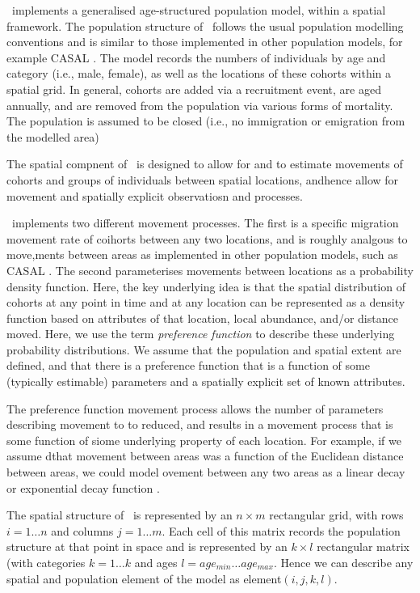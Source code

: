 \SPM\ implements a generalised age-structured population model, within a spatial framework. The population structure of \SPM\ follows the usual population modelling conventions and is similar to those implemented in other population models, for example CASAL \citep{1388}. The model records the numbers of individuals by age and category (i.e., male, female), as well as the locations of these cohorts within a spatial grid. In general, cohorts are added via a recruitment event, are aged annually, and are removed from the population via various forms of mortality. The population is assumed to be closed (i.e., no immigration or emigration from the modelled area)

The spatial compnent of \SPM\ is designed to allow for and to estimate movements of cohorts and groups of individuals between spatial locations, andhence allow for movement and spatially explicit observatiosn and processes. 

\SPM\ implements two different movement processes. The first is a specific migration movement rate of coihorts between any two locations, and is roughly analgous to move,ments between areas as implemented in other population models, such as CASAL \citep{1388}. The second parameterises movements between locations as a probability density function. Here, the key underlying idea is that the spatial distribution of cohorts at any point in time and at any location can be represented as a density function based on attributes of that location, local abundance, and/or distance moved. Here, we use the term \emph{preference function} to describe these underlying probability distributions. We assume that the population and spatial extent are defined, and that there is a preference function that is a function of some (typically estimable) parameters and a spatially explicit set of known attributes.

The preference function movement process allows the number of parameters describing movement to to reduced, and results in a movement process that is some function of siome underlying property of each location. For example, if we assume dthat movement between areas was a function of the Euclidean distance between areas, we could model ovement between any two areas as a linear decay or exponential decay function \citep{1366}.

The spatial structure of \SPM\ is represented by an $n \times m$ rectangular grid, with rows $i=1 \dots n$ and columns $j=1 \ldots m$. Each cell of this matrix records the population structure at that point in space and is represented by an $k \times l$ rectangular matrix (with categories $k=1 \ldots k$ and ages $l=age_{min} \ldots age_{max}$. Hence we can describe any spatial and population element of the model as element$(i,j,k,l)$. 

